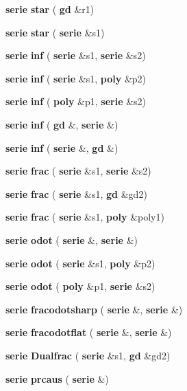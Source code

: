\begin{DoxyCompactItemize}
\mbox{\label{classmmgd_1_1serie_a373238aae64f359f9dd07639e18f2450}} 
\textbf{ serie} {\bfseries star} (\textbf{ gd} \&r1)
\item 
\mbox{\label{classmmgd_1_1serie_ad896bd7caaabe6801478307c7d792f65}} 
\textbf{ serie} {\bfseries star} (\textbf{ serie} \&s1)
\item 
\mbox{\label{classmmgd_1_1serie_a2d481e6996673bb393e494e9597f9149}} 
\textbf{ serie} {\bfseries inf} (\textbf{ serie} \&s1, \textbf{ serie} \&s2)
\item 
\textbf{ serie} \textbf{ inf} (\textbf{ serie} \&s1, \textbf{ poly} \&p2)
\item 
\mbox{\label{classmmgd_1_1serie_a6da306502d5cbecbda9e28e464beb459}} 
\textbf{ serie} {\bfseries inf} (\textbf{ poly} \&p1, \textbf{ serie} \&s2)
\item 
\mbox{\label{classmmgd_1_1serie_a02bcc7dd146114b8b79a0e6864cc7ad4}} 
\textbf{ serie} {\bfseries inf} (\textbf{ gd} \&, \textbf{ serie} \&)
\item 
\mbox{\label{classmmgd_1_1serie_ae5191750772678d2a419a573059e4514}} 
\textbf{ serie} {\bfseries inf} (\textbf{ serie} \&, \textbf{ gd} \&)
\item 
\mbox{\label{classmmgd_1_1serie_a003b5ee69741b8c166467d26f6574c25}} 
\textbf{ serie} {\bfseries frac} (\textbf{ serie} \&s1, \textbf{ serie} \&s2)
\item 
\mbox{\label{classmmgd_1_1serie_a225fb5e2b9dd1f597226271a090a4298}} 
\textbf{ serie} {\bfseries frac} (\textbf{ serie} \&s1, \textbf{ gd} \&gd2)
\item 
\mbox{\label{classmmgd_1_1serie_a1ada807b04afe2bc3299b5e3ffa3f506}} 
\textbf{ serie} {\bfseries frac} (\textbf{ serie} \&s1, \textbf{ poly} \&poly1)
\item 
\mbox{\label{classmmgd_1_1serie_a96a942e6263b0d9e099db5db3a6c0d9b}} 
\textbf{ serie} {\bfseries odot} (\textbf{ serie} \&, \textbf{ serie} \&)
\item 
\mbox{\label{classmmgd_1_1serie_ac5d2d6f470449131209b2ecae26749fa}} 
\textbf{ serie} {\bfseries odot} (\textbf{ serie} \&s1, \textbf{ poly} \&p2)
\item 
\mbox{\label{classmmgd_1_1serie_ae07cb54d85919e3aa78c6ea6a38007b7}} 
\textbf{ serie} {\bfseries odot} (\textbf{ poly} \&p1, \textbf{ serie} \&s2)
\item 
\mbox{\label{classmmgd_1_1serie_ac2ac2502c6f1f27a35fbeeea04fb4c16}} 
\textbf{ serie} {\bfseries fracodotsharp} (\textbf{ serie} \&, \textbf{ serie} \&)
\item 
\mbox{\label{classmmgd_1_1serie_abcdcbf3dc5fe1c1257a5c3ff5cbc0945}} 
\textbf{ serie} {\bfseries fracodotflat} (\textbf{ serie} \&, \textbf{ serie} \&)
\item 
\mbox{\label{classmmgd_1_1serie_a96ec45b632f274cbe3e36ed354c2fb59}} 
\textbf{ serie} {\bfseries Dualfrac} (\textbf{ serie} \&s1, \textbf{ gd} \&gd2)
\item 
\mbox{\label{classmmgd_1_1serie_a2c82a0b41c08782a6bfc3412746ee102}} 
\textbf{ serie} {\bfseries prcaus} (\textbf{ serie} \&)
\end{DoxyCompactItemize}



